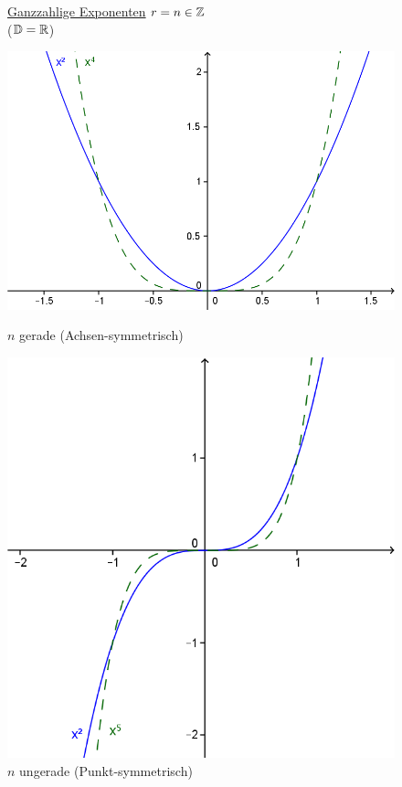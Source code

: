 \begin{enumerate}[A)]
	\begin{figure}[h!]
		\item \ul{Ganzzahlige Exponenten} $r=n\in\mathbb{Z}$\\
		
		 ($\mathbb{D}=\mathbb{R}$)
		
		\begin{minipage}{0.49\linewidth}
			\centering \includegraphics[width=0.9\linewidth]{Bilder/159}
			\caption{$n$ gerade (Achsen-symmetrisch)}
		\end{minipage}
		\begin{minipage}{0.49\linewidth}
			\centering \includegraphics[width=0.7\linewidth]{Bilder/160}
			\caption{$n$ ungerade (Punkt-symmetrisch)}
		\end{minipage}
	\end{figure}
	

\end{enumerate}
